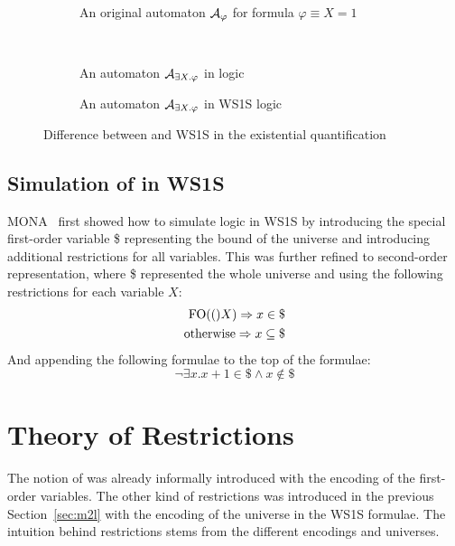 	\begin{figure}[t]
	  \footnotesize
	  \begin{center}
	  \begin{subfigure}[b]{1\textwidth}
		
        \caption{An original automaton $\mathcal{A}_{\varphi}$ for formula $\varphi \equiv X = 1$}
        \label{fig:aut_orig}
      \end{subfigure}%
      \\
	  \begin{subfigure}[b]{0.5\textwidth}
		
        \caption{An automaton $\mathcal{A}_{\exists X.\varphi}$ in \msl logic}
        \label{fig:aut_m2l}
      \end{subfigure}%
      \hfill
	  \begin{subfigure}[b]{0.5\textwidth}
		
        \caption{An automaton $\mathcal{A}_{\exists X.\varphi}$ in WS1S logic}
        \label{fig:aut_ws1s}
      \end{subfigure}%
	  \end{center}
	  \caption{Difference between \msl and WS1S in the existential quantification}\label{fig:ws1s_vs_m2l_aut}
	\end{figure}

	\subsection{Simulation of \msl in WS1S}
	MONA~\cite{mona:m2l} first showed how to simulate \msl logic in
	WS1S by introducing the special first-order variable \$ 
	representing the bound of the universe and introducing additional
	restrictions for all variables. This was further refined to
	second-order representation, where \$ represented the whole
	universe and using the following restrictions for each variable
	$X$:
	\begin{eqnarray}
	\firstorder(X) \Rightarrow x \in \$\\
	\text{otherwise} \Rightarrow x \subseteq \$\\
	\end{eqnarray}
	And appending the following formulae to the top of the formulae:
	\begin{equation}
	\neg\exists x. x + 1 \in \$ \wedge x \notin \$
	\end{equation}
	


\section{Theory of Restrictions}
The notion of was already informally introduced with the encoding
of the first-order variables. The other kind of restrictions was
introduced in the previous Section~\ref{sec:m2l} with the encoding
of the \msl universe in the WS1S formulae. The intuition behind
restrictions stems from the different encodings and universes.

